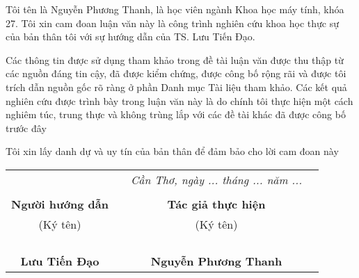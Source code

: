 \documentclass[./thesis.tex]{subfiles}
\begin{document}
{\fontsize{13}{12} \selectfont
Tôi tên là Nguyễn Phương Thanh, là học viên ngành Khoa học máy tính, khóa 27. Tôi xin cam đoan luận văn này là công trình nghiên cứu khoa học thực sự của bản thân tôi với sự hướng dẫn của TS. Lưu Tiến Đạo.

}

\bigskip

{\fontsize{13}{12} \selectfont
Các thông tin được sử dụng tham khảo trong đề tài luận 
văn được thu thập từ các nguồn đáng tin cậy, đã được 
kiểm chứng, được công bố rộng rãi và được tôi trích dẫn nguồn 
gốc rõ ràng ở phần Danh mục Tài liệu tham khảo. Các kết quả 
nghiên cứu được trình bày trong luận văn này là do chính 
tôi thực hiện một cách nghiêm túc, trung thực và không trùng lắp 
với các đề tài khác đã được công bố trước đây

}

\bigskip
{\fontsize{13}{12} \selectfont
    Tôi xin lấy danh dự và uy tín của bản thân để đảm bảo cho 
lời cam đoan này
}
{\fontsize{13}{12} \selectfont


\hspace*{\fill}
\begin{table}[h!]
    \centering
    \begin{tabularx}{\columnwidth}{cXcc}
    
    & & \textit{Cần Thơ, ngày ... tháng ... năm ... }&\\ 
    \\ 
    \textbf{Người hướng dẫn} & & \centering \textbf{Tác giả thực hiện}&\\ 
    \centering (Ký tên) && \centering (Ký tên)&\\ 
    \\ 
    \\
    \\
    \\\centering \textbf{Lưu Tiến Đạo} & &\centering \textbf{Nguyễn Phương Thanh}
    \end{tabularx}
    \end{table}


}
\end{document}
